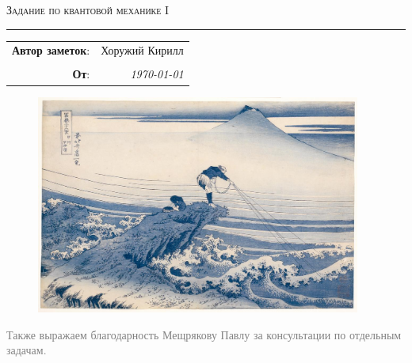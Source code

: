 
\begin{center}
    \LARGE \textsc{Задание по квантовой механике I}
\end{center}

\hrule

\phantom{42}

\begin{flushright}
    \begin{tabular}{rr}
        \textbf{Автор заметок}: 
        & Хоружий Кирилл \\
        & \\
        \textbf{От}: &
        \textit{\today}\\
    \end{tabular}
\end{flushright}

\thispagestyle{empty}
\tableofcontents

\vspace*{\fill}
\begin{figure}[h]
    \centering
    \includegraphics[width=0.95\textwidth]{figures/pic1.jpeg}
\end{figure}

\begin{flushright}
    \textcolor{gray}{
    \small{Также выражаем благодарность Мещрякову Павлу за консультации по отдельным задачам.}}
\end{flushright}
\newpage
